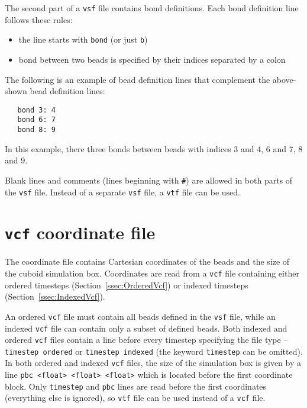 The second part of a \texttt{vsf} file contains bond definitions.  Each
bond definition line follows these rules:

\begin{itemize}[topsep=0pt,itemsep=0pt]
  \item the line starts with \texttt{bond} (or just \texttt{b})
  \item bond between two beads is specified by their indices separated by a
    colon
\end{itemize}

The following is an example of bead definition lines that complement the
above-shown bead definition lines:

\begin{verbatim}
   bond 3: 4
   bond 6: 7
   bond 8: 9
\end{verbatim}

In this example, there three bonds between beads with indices 3 and 4, 6
and 7, 8 and 9.

Blank lines and comments (lines beginning with \texttt{\#}) are allowed in
both parts of the \texttt{vsf} file. Instead of a separate \texttt{vsf}
file, a \texttt{vtf} file can be used.

\section{\texttt{vcf} coordinate file} \label{sec:CoordinateVcf}

The coordinate file contains Cartesian coordinates of the beads and the
size of the cuboid simulation box.
Coordinates are read from a \texttt{vcf} file
containing either ordered timesteps (Section~\ref{ssec:OrderedVcf}) or
indexed timesteps (Section~\ref{ssec:IndexedVcf}).

An ordered \texttt{vcf} file must contain all beads defined in the
\texttt{vsf} file, while an indexed \texttt{vcf} file can contain only a
subset of defined beads. Both indexed and ordered \texttt{vcf} files
contain a line before every timestep specifying the file type --
\texttt{timestep ordered} or \texttt{timestep indexed} (the keyword
\texttt{timestep} can be omitted).  In both ordered and indexed
\texttt{vcf} files, the size of the simulation box is given by a line
\texttt{pbc <float> <float> <float>} which is located before the first
coordinate block. Only \texttt{timestep} and \texttt{pbc} lines are read
before the first coordinates (everything else is ignored), so \texttt{vtf}
file can be used instead of a \texttt{vcf} file.

